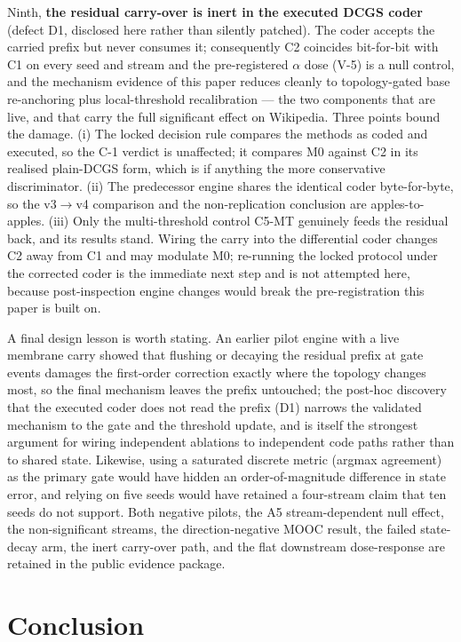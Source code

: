 \documentclass[preprint,12pt]{elsarticle}
\begin{document}
Ninth, \textbf{the residual carry-over is inert in the executed DCGS coder} (defect D1, disclosed here rather than silently patched). The coder accepts the carried prefix but never consumes it; consequently C2 coincides bit-for-bit with C1 on every seed and stream and the pre-registered $\alpha$ dose (V-5) is a null control, and the mechanism evidence of this paper reduces cleanly to topology-gated base re-anchoring plus local-threshold recalibration --- the two components that are live, and that carry the full significant effect on Wikipedia. Three points bound the damage. (i) The locked decision rule compares the methods as coded and executed, so the C-1 verdict is unaffected; it compares M0 against C2 in its realised plain-DCGS form, which is if anything the more conservative discriminator. (ii) The predecessor engine shares the identical coder byte-for-byte, so the v3$\to$v4 comparison and the non-replication conclusion are apples-to-apples. (iii) Only the multi-threshold control C5-MT genuinely feeds the residual back, and its results stand. Wiring the carry into the differential coder changes C2 away from C1 and may modulate M0; re-running the locked protocol under the corrected coder is the immediate next step and is not attempted here, because post-inspection engine changes would break the pre-registration this paper is built on.

A final design lesson is worth stating. An earlier pilot engine with a live membrane carry showed that flushing or decaying the residual prefix at gate events damages the first-order correction exactly where the topology changes most, so the final mechanism leaves the prefix untouched; the post-hoc discovery that the executed coder does not read the prefix (D1) narrows the validated mechanism to the gate and the threshold update, and is itself the strongest argument for wiring independent ablations to independent code paths rather than to shared state. Likewise, using a saturated discrete metric (argmax agreement) as the primary gate would have hidden an order-of-magnitude difference in state error, and relying on five seeds would have retained a four-stream claim that ten seeds do not support. Both negative pilots, the A5 stream-dependent null effect, the non-significant streams, the direction-negative MOOC result, the failed state-decay arm, the inert carry-over path, and the flat downstream dose-response are retained in the public evidence package.

\section{Conclusion}
\label{sec:conclusion}
\end{document}
